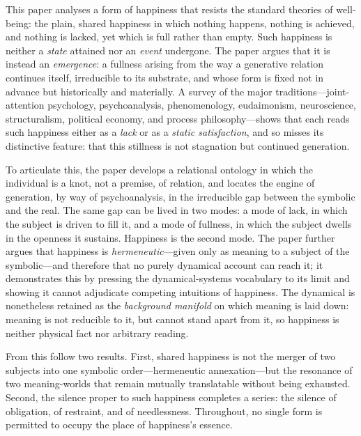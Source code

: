This paper analyses a form of happiness that resists the standard theories of well-being: the plain, shared happiness in which nothing happens, nothing is achieved, and nothing is lacked, yet which is full rather than empty. Such happiness is neither a \emph{state} attained nor an \emph{event} undergone. The paper argues that it is instead an \emph{emergence}: a fullness arising from the way a generative relation continues itself, irreducible to its substrate, and whose form is fixed not in advance but historically and materially. A survey of the major traditions---joint-attention psychology, psychoanalysis, phenomenology, eudaimonism, neuroscience, structuralism, political economy, and process philosophy---shows that each reads such happiness either as a \emph{lack} or as a \emph{static satisfaction}, and so misses its distinctive feature: that this stillness is not stagnation but continued generation.

To articulate this, the paper develops a relational ontology in which the individual is a knot, not a premise, of relation, and locates the engine of generation, by way of psychoanalysis, in the irreducible gap between the symbolic and the real. The same gap can be lived in two modes: a mode of lack, in which the subject is driven to fill it, and a mode of fullness, in which the subject dwells in the openness it sustains. Happiness is the second mode. The paper further argues that happiness is \emph{hermeneutic}---given only as meaning to a subject of the symbolic---and therefore that no purely dynamical account can reach it; it demonstrates this by pressing the dynamical-systems vocabulary to its limit and showing it cannot adjudicate competing intuitions of happiness. The dynamical is nonetheless retained as the \emph{background manifold} on which meaning is laid down: meaning is not reducible to it, but cannot stand apart from it, so happiness is neither physical fact nor arbitrary reading.

From this follow two results. First, shared happiness is not the merger of two subjects into one symbolic order---hermeneutic annexation---but the resonance of two meaning-worlds that remain mutually translatable without being exhausted. Second, the silence proper to such happiness completes a series: the silence of obligation, of restraint, and of needlessness. Throughout, no single form is permitted to occupy the place of happiness's essence.
